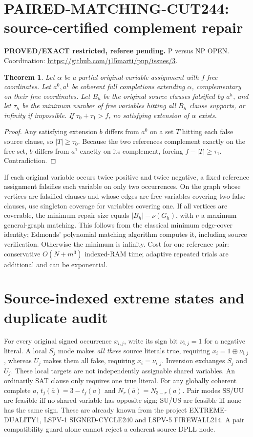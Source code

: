 \documentclass{article}
\newtheorem{theorem}{Theorem}
\begin{document}
\section*{PAIRED-MATCHING-CUT244: source-certified complement repair}
\noindent\textbf{PROVED/EXACT restricted, referee pending.} P versus NP OPEN. Coordination: \url{https://github.com/j15marti/pnp/issues/3}.
\begin{theorem}
Let $\alpha$ be a partial original-variable assignment with $f$ free coordinates. Let $a^0,a^1$ be coherent full completions extending $\alpha$, complementary on their free coordinates. Let $B_h$ be the original source clauses falsified by $a^h$, and let $\tau_h$ be the minimum number of free variables hitting all $B_h$ clause supports, or infinity if impossible. If $\tau_0+\tau_1>f$, no satisfying extension of $\alpha$ exists.
\end{theorem}
\begin{proof}
Any satisfying extension $b$ differs from $a^0$ on a set $T$ hitting each false source clause, so $|T|\ge\tau_0$. Because the two references complement exactly on the free set, $b$ differs from $a^1$ exactly on its complement, forcing $f-|T|\ge\tau_1$. Contradiction.
\end{proof}
If each original variable occurs twice positive and twice negative, a fixed reference assignment falsifies each variable on only two occurrences. On the graph whose vertices are falsified clauses and whose edges are free variables covering two false clauses, use singleton coverage for variables covering one. If all vertices are coverable, the minimum repair size equals $|B_h|-\nu(G_h)$, with $\nu$ a maximum general-graph matching. This follows from the classical minimum edge-cover identity; Edmonds' polynomial matching algorithm computes it, including source verification. Otherwise the minimum is infinity. Cost for one reference pair: conservative $O(N+m^3)$ indexed-RAM time; adaptive repeated trials are additional and can be exponential.

\section*{Source-indexed extreme states and duplicate audit}
For every original signed occurrence $x_{i,j}$, write its sign bit $\nu_{i,j}=1$ for a negative literal. A local $S_j$ mode makes \emph{all three} source literals true, requiring $x_i=1\oplus\nu_{i,j}$, whereas $U_j$ makes them all false, requiring $x_i=\nu_{i,j}$. Inversion exchanges $S_j$ and $U_j$. These local targets are not independently assignable shared variables. An ordinarily SAT clause only requires one true literal. For any globally coherent complete $a$, $t_j(\bar a)=3-t_j(a)$ and $N_r(\bar a)=N_{3-r}(a)$. Pair modes SS/UU are feasible iff no shared variable has opposite sign; SU/US are feasible iff none has the same sign. These are already known from the project EXTREME-DUALITY1, LSPV-1 SIGNED-CYCLE240 and LSPV-5 FIREWALL214. A pair compatibility guard alone cannot reject a coherent source DPLL node.
\end{document}
